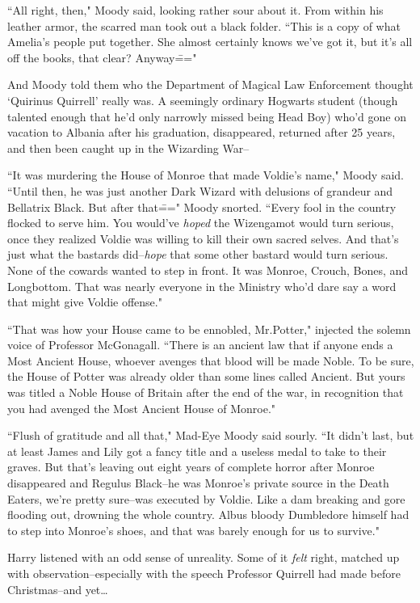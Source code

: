 ``All right, then," Moody said, looking rather sour about it. From within his leather armor, the scarred man took out a black folder. ``This is a copy of what Amelia's people put together. She almost certainly knows we've got it, but it's all off the books, that clear? Anyway\==="

And Moody told them who the Department of Magical Law Enforcement thought `Quirinus Quirrell' really was. A seemingly ordinary Hogwarts student (though talented enough that he'd only narrowly missed being Head Boy) who'd gone on vacation to Albania after his graduation, disappeared, returned after 25 years, and then been caught up in the Wizarding War\---

``It was murdering the House of Monroe that made Voldie's name," Moody said. ``Until then, he was just another Dark Wizard with delusions of grandeur and Bellatrix Black. But after that\===" Moody snorted. ``Every fool in the country flocked to serve him. You would've \emph{hoped} the Wizengamot would turn serious, once they realized Voldie was willing to kill their own sacred selves. And that's just what the bastards did\---\emph{hope} that some other bastard would turn serious. None of the cowards wanted to step in front. It was Monroe, Crouch, Bones, and Longbottom. That was nearly everyone in the Ministry who'd dare say a word that might give Voldie offense."

``That was how your House came to be ennobled, Mr.\?Potter," injected the solemn voice of Professor McGonagall. ``There is an ancient law that if anyone ends a Most Ancient House, whoever avenges that blood will be made Noble. To be sure, the House of Potter was already older than some lines called Ancient. But yours was titled a Noble House of Britain after the end of the war, in recognition that you had avenged the Most Ancient House of Monroe."

``Flush of gratitude and all that," Mad-Eye Moody said sourly. ``It didn't last, but at least James and Lily got a fancy title and a useless medal to take to their graves. But that's leaving out eight years of complete horror after Monroe disappeared and Regulus Black\---he was Monroe's private source in the Death Eaters, we're pretty sure\---was executed by Voldie. Like a dam breaking and gore flooding out, drowning the whole country. Albus bloody Dumbledore himself had to step into Monroe's shoes, and that was barely enough for us to survive."

Harry listened with an odd sense of unreality. Some of it \emph{felt} right, matched up with observation\---especially with the speech Professor Quirrell had made before Christmas\---and yet{\ldots}

